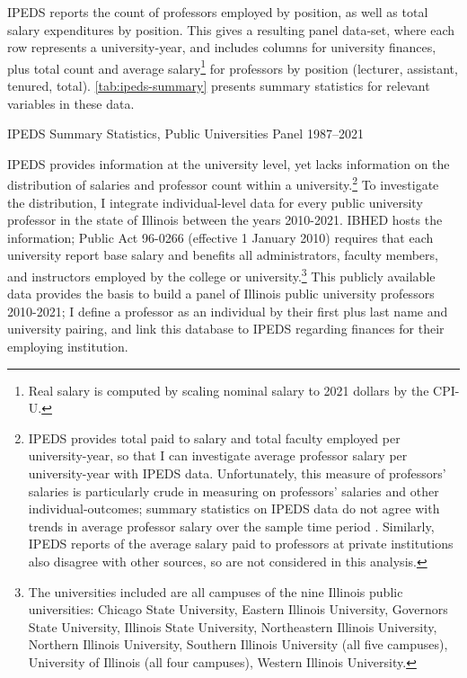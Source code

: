 IPEDS reports the count of professors employed by position, as well as total salary expenditures by position.
This gives a resulting panel data-set, where each row represents a university-year, and includes columns for university finances, plus total count and average salary\footnote{
    Real salary is computed by scaling nominal salary to 2021 dollars by the CPI-U.
} for professors by position (lecturer, assistant, tenured, total).
\autoref{tab:ipeds-summary} presents summary statistics for relevant variables in these data.

\begin{table}[h!]
    \singlespacing
    \centering
    \caption{IPEDS Summary Statistics, Public Universities Panel 1987--2021}
    \makebox[\textwidth][c]{}
    \label{tab:ipeds-summary}
\end{table}

IPEDS provides information at the university level, yet lacks information on the distribution of salaries and professor count within a university.\footnote{
    IPEDS provides total paid to salary and total faculty employed per university-year, so that I can investigate average professor salary per university-year with IPEDS data.
    Unfortunately, this measure of professors' salaries is particularly crude in measuring on professors' salaries and other individual-outcomes; summary statistics on IPEDS data do not agree with trends in average professor salary over the sample time period \citep{aau2021survey}.
    Similarly, IPEDS reports of the average salary paid to professors at private institutions also disagree with other sources, so are not considered in this analysis.
}
To investigate the distribution, I integrate individual-level data for every public university professor in the state of Illinois between the years 2010-2021.
IBHED hosts the information;
Public Act 96-0266 (effective 1 January 2010) requires that each university report base salary and benefits all administrators, faculty members, and instructors employed by the college or university.\footnote{
    The universities included are all campuses of the nine Illinois public universities: Chicago State University, Eastern Illinois University, Governors State University, Illinois State University, Northeastern Illinois University, Northern Illinois University, Southern Illinois University  (all five campuses), University of Illinois (all four campuses), Western Illinois University.
}
This publicly available data provides the basis to build a panel of Illinois public university professors 2010-2021; I define a professor as an individual by their first plus last name and university pairing, and link this database to IPEDS regarding finances for their employing institution.

